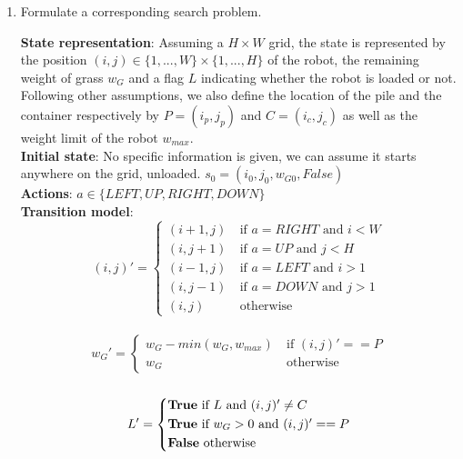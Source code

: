 \documentclass[11pt, a4paper]{article}
\begin{document}
\begin{enumerate}
    \item Formulate a corresponding search problem.
    
    \begin{solution}
        \textbf{State representation}: Assuming a $H\times W$ grid, the state is represented by the position $(i,j) \in \{1,...,W\}\times \{1,...,H\}$ of the robot, the remaining weight of grass $w_G$ and a flag $L$ indicating whether the robot is loaded or not. Following other assumptions, we also define the location of the pile and the container respectively by $P = (i_p,j_p)$ and $C = (i_c,j_c)$ as well as the weight limit of the robot $w_{max}$.\\
        
        \textbf{Initial state}: No specific information is given, we can assume it starts anywhere on the grid, unloaded. $s_0 = (i_0, j_0, w_{G0}, False)$\\
        
        \textbf{Actions}: $a \in \{LEFT, UP, RIGHT, DOWN\}$\\
        
        \textbf{Transition model}: \[(i,j)' = \begin{cases*}
            (i+1,j)\ &\text{if $a = RIGHT$ and $i < W$}\\
            (i,j+1)\ &\text{if $a = UP$ and $j < H$}\\
            (i-1,j)\ &\text{if $a = LEFT$ and $i > 1$}\\
            (i,j-1)\ &\text{if $a = DOWN$ and $j > 1$}\\
            (i,j)\ &\text{otherwise}
        \end{cases*}\]\\
        \[w_G' = \begin{cases*}
            w_G - min(w_G, w_{max})\ &\text{if $(i,j)' == P$}\\
            w_G\ &\text{otherwise}
        \end{cases*}\]\\
        \[L' = \begin{cases*}
            \text{\textbf{True} if $L$ and $(i,j)' \not = C$}\\
            \text{\textbf{True} if $w_G > 0$ and $(i,j)' == P$}\\
            \text{\textbf{False} otherwise}
        \end{cases*}\]\\
        

\end{solution}
\end{enumerate}
\end{document}
